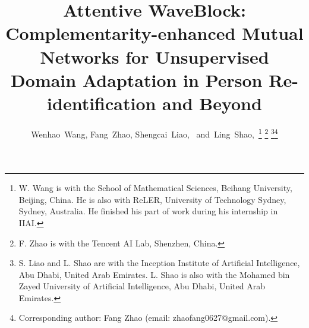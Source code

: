 \documentclass[journal]{IEEEtran}
\begin{document}
\title{Attentive WaveBlock: Complementarity-enhanced Mutual Networks for Unsupervised Domain Adaptation in Person Re-identification and Beyond}


\author{Wenhao~Wang, Fang~Zhao, 
        Shengcai~Liao,~
        and~Ling~Shao,~\thanks{W. Wang is with the School of Mathematical Sciences, Beihang University, Beijing, China. He is also with ReLER, University of Technology Sydney, Sydney, Australia. He finished his part of work during his internship in IIAI.}
\thanks{F. Zhao is with the Tencent AI Lab, Shenzhen, China.}
\thanks{S. Liao and L. Shao  are with the Inception Institute of Artificial Intelligence, Abu Dhabi, United Arab Emirates. L. Shao is also with the Mohamed bin Zayed University of Artificial Intelligence, Abu Dhabi, United Arab Emirates.}\thanks{Corresponding author: Fang Zhao (email: zhaofang0627@gmail.com).}}



















\maketitle
\end{document}
